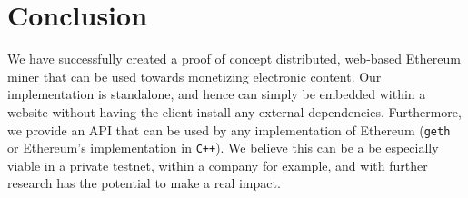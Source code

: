 \documentclass[10pt, conference, compsocconf]{IEEEtran}
\begin{document}
\section{Conclusion}
We have successfully created a proof of concept distributed, web-based Ethereum miner that can be used towards monetizing electronic content. Our implementation is standalone, and hence can simply be embedded within a website without having the client install any external dependencies. Furthermore, we provide an API that can be used by any implementation of Ethereum (\verb|geth| or Ethereum's implementation in \verb|C++|). We believe this can be a be especially viable in a private testnet, within a company for example, and with further research has the potential to make a real impact.





\end{document}
